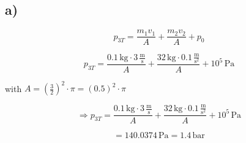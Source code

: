 

\subsection*{a)}

\[
p_{3T} = \frac{m_{1}v_{1}}{A} + \frac{m_{2}v_{2}}{A} + p_{0}
\]

\[
p_{3T} = \frac{0.1 \, \text{kg} \cdot 3 \, \frac{\text{m}}{\text{s}}}{A} + \frac{32 \, \text{kg} \cdot 0.1 \, \frac{\text{m}}{\text{s}^2}}{A} + 10^5 \, \text{Pa}
\]

with \( A = \left(\frac{3}{2}\right)^2 \cdot \pi = (0.5)^2 \cdot \pi \)

\[
\Rightarrow p_{3T} = \frac{0.1 \, \text{kg} \cdot 3 \, \frac{\text{m}}{\text{s}}}{A} + \frac{32 \, \text{kg} \cdot 0.1 \, \frac{\text{m}}{\text{s}^2}}{A} + 10^5 \, \text{Pa}
\]

\[
= 140.0374 \, \text{Pa} = 1.4 \, \text{bar}
\]